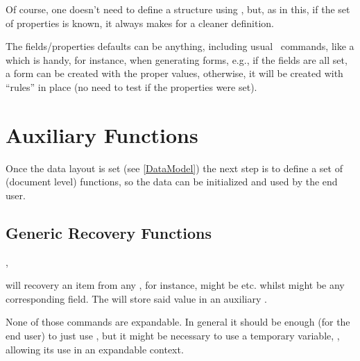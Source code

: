 \documentclass[10pt]{article}
\begin{document}
Of course, one doesn't need to define a  structure using , but, as in this,  if the set of properties is known, it always makes for a cleaner definition.

\begin{tsremark}
  The fields/properties defaults can be anything, including usual \LaTeXe\  commands, like a \tsobj{\rule} which is handy, for instance, when generating forms, e.g., if the fields are all set, a form can be created with the proper values, otherwise, it will be  created with ``rules'' in place (no need to test if the properties were set).
\end{tsremark}









\section{Auxiliary Functions}
Once the data layout is set (see \ref{DataModel}) the next step is to define a set of (document level) functions, so the data can be initialized and used by the end user.

\subsection{Generic Recovery Functions}\label{generic:datafield}

\begin{codedescribe}{\DataField,\DataGet}
  \begin{codesyntax}
  \end{codesyntax}
\tsobj{\DataField} will recovery an item from any , for instance,  might be  etc. whilst  might be any corresponding field. The \tsobj{\DataGet} will store said value in an auxiliary .
\begin{tsremark}
  None of those commands are expandable. In general it should be enough (for the end user) to just use \tsobj{\DataField}, but it might be necessary to use a temporary variable, , allowing  its use in an expandable context.
\end{tsremark}
\end{codedescribe}
\end{document}
